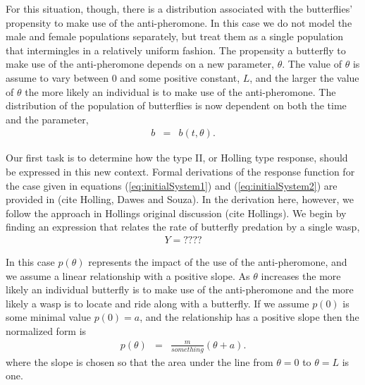 \documentclass[12pt]{article}
\begin{document}
For this situation, though, there is a distribution associated with
the butterflies' propensity to make use of the anti-pheromone. In this
case we do not model the male and female populations separately, but
treat them as a single population that intermingles in a relatively
uniform fashion. The propensity a butterfly to make use of the
anti-pheromone depends on a new parameter, $\theta$. The value of
$\theta$ is assume to vary between $0$ and some positive constant,
$L$, and the larger the value of $\theta$ the more likely an
individual is to make use of the anti-pheromone. The distribution of
the population of butterflies is now dependent on both the time and
the parameter,
\begin{eqnarray}
  b & = & b(t,\theta).
\end{eqnarray}

Our first task is to determine how the type II, or Holling type
response, should be expressed in this new context. Formal derivations
of the response function for the case given in equations
(\ref{eq:initialSystem1}) and (\ref{eq:initialSystem2}) are provided in
(cite Holling, Dawes and Souza). In the derivation here, however,
we follow the approach in Hollings original discussion (cite
Hollings). We begin by finding an expression that relates the rate of
butterfly predation by a single wasp,
\begin{eqnarray}
  \label{eq:processingTime}
  Y = ????
\end{eqnarray}

In this case $p(\theta)$ represents the impact of the use of the
anti-pheromone, and we assume a linear relationship with a positive
slope. As $\theta$ increases the more likely an individual butterfly
is to make use of the anti-pheromone and the more likely a wasp is to
locate and ride along with a butterfly. If we assume $p(0)$ is some
minimal value $p(0)=a$, and the relationship has a positive slope then
the normalized form is
\begin{eqnarray}
  \label{eq:linearFormP}
  p(\theta) & = & \frac{m}{something} \left( \theta + a \right).
\end{eqnarray}
where the slope is chosen so that the area under the line from
$\theta=0$ to $\theta=L$ is one.
\end{document}

